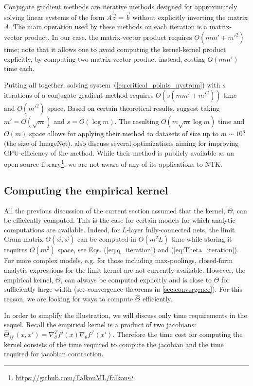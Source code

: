 \documentclass{article}
\begin{document}
    Conjugate gradient methods are iterative methods designed for approximately solving linear systems of the form $A \vec z = \vec b$ without explicitly inverting the matrix $A$.
    The main operation used by these methods on each iteration is a matrix-vector product.
    In our case, the matrix-vector product requires $O(mm' + {m'}^2)$ time; note that it allows one to avoid computing the kernel-kernel product explicitly, by computing two matrix-vector product instead, costing $O(mm')$ time each.
    
    Putting all together, solving system~(\ref{eq:critical_points_nystrom}) with $s$ iterations of a conjugate gradient method requires $O(s(mm' + {m'}^2))$ time and $O({m'}^2)$ space.
    Based on certain theoretical results, \cite{meanti2020kernel} suggest taking $m' = O(\sqrt{m})$ and $s = O(\log m)$.
    The resulting $O(m \sqrt{m} \log m)$ time and $O(m)$ space allows for applying their method to datasets of size up to $m \sim 10^6$ (the size of ImageNet).
    \cite{meanti2020kernel} also discuss several optimizations aiming for improving GPU-efficiency of the method.
    While their method is publicly available as an open-source library\footnote{\url{https://github.com/FalkonML/falkon}}, we are not aware of any of its applications to NTK.


    \subsection{Computing the empirical kernel}

    All the previous discussion of the current section assumed that the kernel, $\Theta$, can be efficiently computed.
    This is the case for certain models for which analytic computations are available.
    Indeed, for $L$-layer fully-connected nets, the limit Gram matrix $\Theta(\vec x, \vec x)$ can be computed in $O(m^2 L)$ time while storing it requires $O(m^2)$ space, see Eqs. (\ref{eq:q_iteration}) and (\ref{eq:Theta_iteration}).
    For more complex models, e.g. for those including max-poolings, closed-form analytic expressions for the limit kernel are not currently available.
    However, the empirical kernel, $\hat\Theta$, can always be computed explicitly and is close to $\Theta$ for sufficiently large width (see convergence theorems in \cref{sec:convergence}).
    For this reason, we are looking for ways to compute $\hat\Theta$ efficiently.

    In order to simplify the illustration, we will discuss only time requirements in the sequel.
    Recall the empirical kernel is a product of two jacobians: $\hat\Theta_{jj'}(x,x') = \nabla^T_\theta f^j(x) \nabla_\theta f^{j'}(x')$.
    Therefore the time cost for computing the kernel consists of the time required to compute the jacobian and the time required for jacobian contraction.
\end{document}
